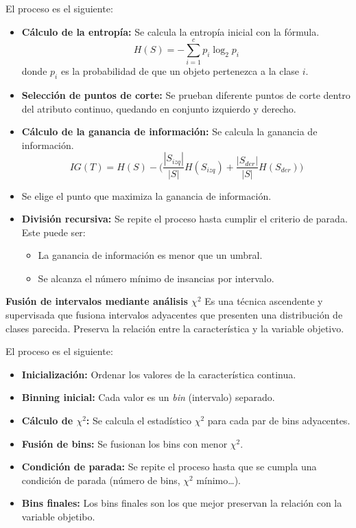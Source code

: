 \documentclass[12pt, letterpaper]{article}
\begin{document}
El proceso es el siguiente:
\begin{itemize}
    \item \textbf{Cálculo de la entropía:} Se calcula la entropía inicial con la fórmula.
    \[
        H(S) = -\sum_{i=1}^{c} p_i \log_2 p_i
    \]
    donde $p_i$ es la probabilidad de que un objeto pertenezca a la clase $i$.
    \item \textbf{Selección de puntos de corte:} Se prueban diferente puntos de corte dentro del atributo continuo, quedando en conjunto izquierdo y derecho.
    \item \textbf{Cálculo de la ganancia de información:} Se calcula la ganancia de información.
    \[
        IG(T) = H(S) - \bigg( \frac{|S_{izq}|}{|S|}H(S_{izq}) + \frac{|S_{der}|}{|S|}H(S_{der}) \bigg)
    \]

    \item Se elige el punto que maximiza la ganancia de información.
    \item \textbf{División recursiva:} Se repite el proceso hasta cumplir el criterio de parada. Este puede ser:
    \begin{itemize}
        \item La ganancia de información es menor que un umbral.
        \item Se alcanza el número mínimo de insancias por intervalo.
    \end{itemize}
\end{itemize}

\vspace{1 em}
\textbf{Fusión de intervalos mediante análisis $\chi^2$}
Es una técnica ascendente y supervisada que fusiona intervalos adyacentes que presenten una distribución de clases parecida. Preserva la relación entre la característica y la variable objetivo.

El proceso es el siguiente:
\begin{itemize}
    \item \textbf{Inicialización:} Ordenar los valores de la característica continua.
    \item \textbf{Binning inicial:} Cada valor es un \textit{bin} (intervalo) separado.
    \item \textbf{Cálculo de $\chi^2$:} Se calcula el estadístico $\chi^2$ para cada par de bins adyacentes.
    \item \textbf{Fusión de bins:} Se fusionan los bins con menor $\chi^2$.
    \item \textbf{Condición de parada:} Se repite el proceso hasta que se cumpla una condición de parada (número de bins, $\chi^2$ mínimo\dots).
    \item \textbf{Bins finales:} Los bins finales son los que mejor preservan la relación con la variable objetibo.
\end{itemize}
\end{document}
